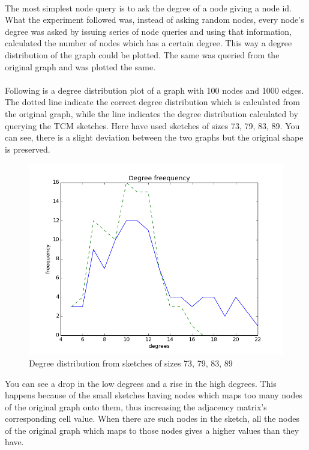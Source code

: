\documentclass[12pt]{report}
\numberwithin{figure}{section}
\numberwithin{table}{section}
\begin{document}
\paragraph{}

The most simplest node query is to ask the degree of a node giving a node id. What the experiment followed was, instead of asking random nodes, every node’s degree was asked by issuing series of node queries and using that information, calculated the number of nodes which has a certain degree. This way a degree distribution of the graph could be plotted. The same was queried from the original graph and was plotted the same.

\paragraph{}

Following is a degree distribution plot of a graph with 100 nodes and 1000 edges. The dotted line indicate the correct degree distribution which is calculated from the original graph, while the line indicates the degree distribution calculated by querying the TCM sketches. Here have used sketches of sizes 73, 79, 83, 89. You can see, there is a slight deviation between the two graphs but the original shape is preserved. 

\begin{figure}[H]
\centering
\includegraphics[scale=0.8]{images/dd1}
\caption{Degree distribution from sketches of sizes 73, 79, 83, 89}
\end{figure}

You can see a drop in the low degrees and a rise in the high degrees. This happens because of the small sketches having nodes which maps too many nodes of the original graph onto them, thus increasing the adjacency matrix’s corresponding cell value. When there are such nodes in the sketch, all the nodes of the original graph which maps to those nodes gives a higher values than they have. 
\end{document}
